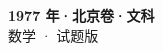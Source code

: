 \documentclass[zihao=-4, a4paper]{ctexart}
\begin{document}
\begin{center}
  {\Large\bfseries 1977 年·北京卷·文科}\\[4pt]
  {\large 数学 · 试题版}
\end{center}
\medskip
{}

\end{document}
